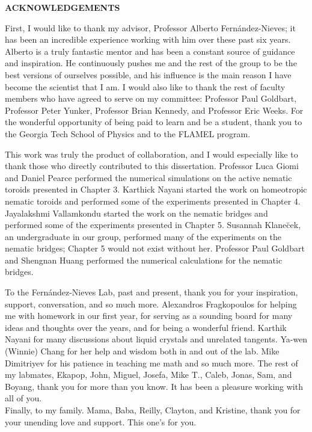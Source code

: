 \clearpage
\begin{centering}
\textbf{ACKNOWLEDGEMENTS}\\
\vspace{\baselineskip}
\end{centering}

First, I would like to thank my advisor, Professor Alberto Fern\'andez-Nieves; it has been an incredible experience working with him over these past six years.
Alberto is a truly fantastic mentor and has been a constant source of guidance and inspiration.
He continuously pushes me and the rest of the group to be the best versions of ourselves possible, and his influence is the main reason I have become the scientist that I am.
I would also like to thank the rest of faculty members who have agreed to serve on my committee: Professor Paul Goldbart, Professor Peter Yunker, Professor Brian Kennedy, and Professor Eric Weeks.
For the wonderful opportunity of being paid to learn and be a student, thank you to the Georgia Tech School of Physics and to the FLAMEL program.

This work was truly the product of collaboration, and I would especially like to thank those who directly contributed to this dissertation.
Professor Luca Giomi and Daniel Pearce performed the numerical simulations on the active nematic toroids presented in Chapter 3.
Karthick Nayani started the work on homeotropic nematic toroids and performed some of the experiments presented in Chapter 4.
Jayalakshmi Vallamkondu started the work on the nematic bridges and performed some of the experiments presented in Chapter 5.
Susannah Klane\u{c}ek, an undergraduate in our group, performed many of the experiments on the nematic bridges; Chapter 5 would not exist without her.
Professor Paul Goldbart and Shengnan Huang performed the numerical calculations for the nematic bridges.

To the Fern\'andez-Nieves Lab, past and present, thank you for your inspiration, support, conversation, and so much more.
Alexandros Fragkopoulos for helping me with homework in our first year, for serving as a sounding board for many ideas and thoughts over the years, and for being a wonderful friend.
Karthik Nayani for many discussions about liquid crystals and unrelated tangents.
Ya-wen (Winnie) Chang for her help and wisdom both in and out of the lab.
Mike Dimitriyev for his patience in teaching me math and so much more.
The rest of my labmates, Ekapop, John, Miguel, Josefa, Mike T., Caleb, Jonas, Sam, and Boyang, thank you for more than you know.
It has been a pleasure working with all of you. \\

\noindent Finally, to my family.
Mama, Baba, Reilly, Clayton, and Kristine, thank you for your unending love and support.
This one's for you.

\clearpage
